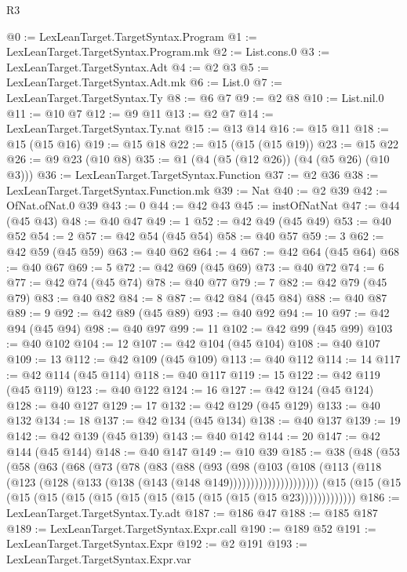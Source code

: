 \begin{lexlean}{R3}
\begin{coremodule}
@0 := LexLeanTarget.TargetSyntax.Program
@1 := LexLeanTarget.TargetSyntax.Program.mk
@2 := List.cons.{0}
@3 := LexLeanTarget.TargetSyntax.Adt
@4 := @2 @3
@5 := LexLeanTarget.TargetSyntax.Adt.mk
@6 := List.{0}
@7 := LexLeanTarget.TargetSyntax.Ty
@8 := @6 @7
@9 := @2 @8
@10 := List.nil.{0}
@11 := @10 @7
@12 := @9 @11
@13 := @2 @7
@14 := LexLeanTarget.TargetSyntax.Ty.nat
@15 := @13 @14
@16 := @15 @11
@18 := @15 (@15 @16)
@19 := @15 @18
@22 := @15 (@15 (@15 @19))
@23 := @15 @22
@26 := @9 @23 (@10 @8)
@35 := @1 (@4 (@5 (@12 @26)) (@4 (@5 @26) (@10 @3)))
@36 := LexLeanTarget.TargetSyntax.Function
@37 := @2 @36
@38 := LexLeanTarget.TargetSyntax.Function.mk
@39 := Nat
@40 := @2 @39
@42 := OfNat.ofNat.{0} @39
@43 := 0
@44 := @42 @43
@45 := instOfNatNat
@47 := @44 (@45 @43)
@48 := @40 @47
@49 := 1
@52 := @42 @49 (@45 @49)
@53 := @40 @52
@54 := 2
@57 := @42 @54 (@45 @54)
@58 := @40 @57
@59 := 3
@62 := @42 @59 (@45 @59)
@63 := @40 @62
@64 := 4
@67 := @42 @64 (@45 @64)
@68 := @40 @67
@69 := 5
@72 := @42 @69 (@45 @69)
@73 := @40 @72
@74 := 6
@77 := @42 @74 (@45 @74)
@78 := @40 @77
@79 := 7
@82 := @42 @79 (@45 @79)
@83 := @40 @82
@84 := 8
@87 := @42 @84 (@45 @84)
@88 := @40 @87
@89 := 9
@92 := @42 @89 (@45 @89)
@93 := @40 @92
@94 := 10
@97 := @42 @94 (@45 @94)
@98 := @40 @97
@99 := 11
@102 := @42 @99 (@45 @99)
@103 := @40 @102
@104 := 12
@107 := @42 @104 (@45 @104)
@108 := @40 @107
@109 := 13
@112 := @42 @109 (@45 @109)
@113 := @40 @112
@114 := 14
@117 := @42 @114 (@45 @114)
@118 := @40 @117
@119 := 15
@122 := @42 @119 (@45 @119)
@123 := @40 @122
@124 := 16
@127 := @42 @124 (@45 @124)
@128 := @40 @127
@129 := 17
@132 := @42 @129 (@45 @129)
@133 := @40 @132
@134 := 18
@137 := @42 @134 (@45 @134)
@138 := @40 @137
@139 := 19
@142 := @42 @139 (@45 @139)
@143 := @40 @142
@144 := 20
@147 := @42 @144 (@45 @144)
@148 := @40 @147
@149 := @10 @39
@185 := @38
    (@48
      (@53
        (@58
          (@63
            (@68
              (@73
                (@78
                  (@83
                    (@88
                      (@93
                        (@98
                          (@103
                            (@108
                              (@113
                                (@118 (@123 (@128 (@133 (@138 (@143 (@148 @149)))))))))))))))))))))
    (@15 (@15 (@15 (@15 (@15 (@15 (@15 (@15 (@15 (@15 (@15 (@15 (@15 @23)))))))))))))
@186 := LexLeanTarget.TargetSyntax.Ty.adt
@187 := @186 @47
@188 := @185 @187
@189 := LexLeanTarget.TargetSyntax.Expr.call
@190 := @189 @52
@191 := LexLeanTarget.TargetSyntax.Expr
@192 := @2 @191
@193 := LexLeanTarget.TargetSyntax.Expr.var

\end{coremodule}
\end{lexlean}
